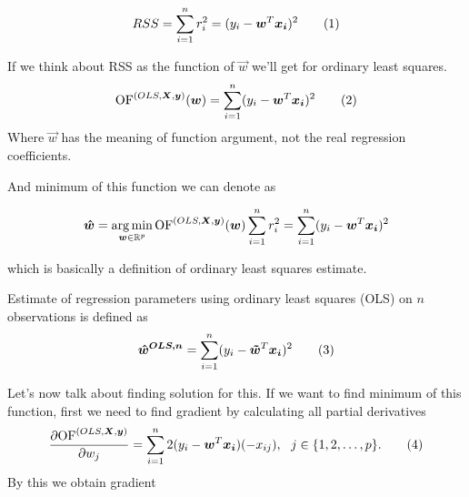 \begin{equation}
    RSS = \sum\limits_{i=1}^n r_i^2 = (y_i - \vec{w}^T\vec{x_i})^2 \numberthis
\end{equation}

\begin{definition} If we think about RSS as the function of $\vec{w}$ we'll get  for ordinary least squares. 
    \begin{equation}
        \of^{(OLS,\vec{X}, \vec{y})}(\vec{w}) = \sum\limits_{i=1}^n (y_i - \vec{w}^T\vec{x_i})^2 \numberthis
    \end{equation}
Where $\vec{w}$ has the meaning of function argument, not the real regression coefficients.
\end{definition}

And minimum of this function we can denote as 




\begin{equation}
    \boldsymbol{\hat{w}} = \operatorname*{arg\,min}_{\boldsymbol{w} \in \mathbb{R}^p} \operatorname{OF}^{(OLS,\boldsymbol{X}, \boldsymbol{y})}(\boldsymbol{w}) 
    \sum\limits_{i=1}^n r_i^2 = \sum\limits_{i=1}^n (y_i - \boldsymbol{w}^T\boldsymbol{x_i})^2 
\end{equation}

which is basically a definition of ordinary least squares estimate.

\begin{definition} Estimate of regression parameters using ordinary least squares (OLS) on $n$ observations is defined as
    \begin{equation}
        \vec{\hat{w}^{OLS, n}} =  \sum\limits_{i=1}^n (y_i - \vec{\tilde{w}}^T\vec{x_i})^2 \numberthis
    \end{equation}
\end{definition}

Let's now talk about finding solution for this. If we want to find minimum of this function, first we need to find gradient by calculating all partial derivatives
\begin{equation}
    \frac{\partial {\of^{(OLS,\vec{X}, \vec{y})}} }{\partial w_j} = \sum\limits_{i=1}^n 2(y_i - \vec{w}^T\vec{x_i})(-x_{ij}) \\, \ \ j \in \{{1,2,\ldots,p\}}. \numberthis
\end{equation}
By this we obtain gradient 

